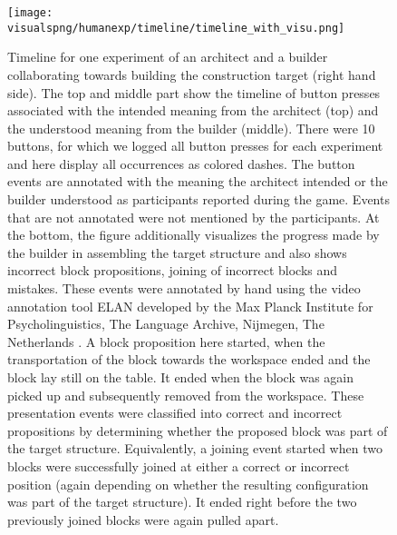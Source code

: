 \begin{figure}[!htbp]
\begin{widepage}
\centering
\texttt{[image: \\visualspng/humanexp/timeline/timeline\_with\_visu.png]}
\end{widepage}
\caption{Timeline for one experiment of an architect and a builder collaborating towards building the construction target (right hand side). The top and middle part show the timeline of button presses associated with the intended meaning from the architect (top) and the understood meaning from the builder (middle). There were 10 buttons, for which we logged all button presses for each experiment and here display all occurrences as colored dashes. The button events are annotated with the meaning the architect intended or the builder understood as participants reported during the game. Events that are not annotated were not mentioned by the participants. At the bottom, the figure additionally visualizes the progress made by the builder in assembling the target structure and also shows incorrect block propositions, joining of incorrect blocks and mistakes. These events were annotated by hand using the video annotation tool ELAN developed by the Max Planck Institute for Psycholinguistics, The Language Archive, Nijmegen, The Netherlands \cite{wittenburg2006elan}. A block proposition here started, when the transportation of the block towards the workspace ended and the block lay still on the table. It ended when the block was again picked up and subsequently removed from the workspace. These presentation events were classified into correct and incorrect propositions by determining whether the proposed block was part of the target structure. Equivalently, a joining event started when two blocks were successfully joined at either a correct or incorrect position (again depending on whether the resulting configuration was part of the target structure). It ended right before the two previously joined blocks were again pulled apart.}
\label{fig:timeline}
\end{figure}

